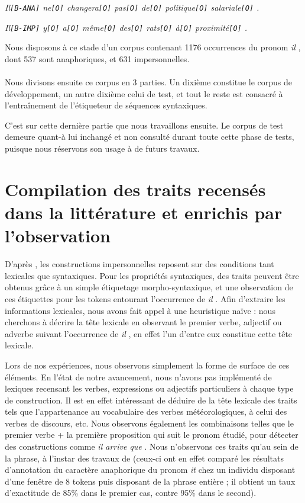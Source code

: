 \documentclass[a4paper,12pt]{article}
\begin{document}
\textit{Il\verb![B-ANA]! ne\verb![O]! changera\verb![O]! pas\verb![O]! de\verb![O]! politique\verb![O]! salariale\verb![O]! .}

\textit{Il\verb![B-IMP]! y\verb![O]! a\verb![O]! même\verb![O]! des\verb![O]! rats\verb![O]! à\verb![O]! proximité\verb![O]! .}

Nous disposons à ce stade d'un corpus contenant 1176 occurrences du pronom \og \textit{il} \fg{}, dont 537 sont anaphoriques, et 631 impersonnelles.

\paragraph{}
Nous divisons ensuite ce corpus en 3 parties. Un dixième constitue le corpus de développement, un autre dixième celui de test, et tout le reste est consacré à l'entraînement de l'étiqueteur de séquences syntaxiques.


C'est sur cette dernière partie que nous travaillons ensuite.
Le corpus de test demeure quant-à lui inchangé et non consulté durant toute cette phase de tests, puisque nous réservons son usage à de futurs travaux.

\section{Compilation des traits recensés dans la littérature et enrichis par l'observation}
\label{approche-traits}

D'après \citeauthor{danlos-ilimp-taln2005}, les constructions impersonnelles reposent sur des conditions tant lexicales que syntaxiques. Pour les propriétés syntaxiques, des traits peuvent \^etre obtenus grâce à un simple étiquetage morpho-syntaxique, et une observation de ces étiquettes pour les tokens entourant l'occurrence de \og \textit{il} \fg{}. Afin d'extraire les informations lexicales, nous avons fait appel à une heuristique naïve : nous cherchons à décrire la tête lexicale en observant le premier verbe, adjectif ou adverbe suivant l'occurrence de \og \textit{il} \fg{}, en effet l'un d'entre eux constitue cette tête lexicale.

Lors de nos expériences, nous observons simplement la forme de surface de ces éléments. En l'état de notre avancement, nous n'avons pas implémenté de lexiques recensant les verbes, expressions ou adjectifs particuliers à chaque type de construction. Il est en effet intéressant de déduire de la tête lexicale des traits tels que l'appartenance au vocabulaire des verbes météorologiques, à celui des verbes de discours, etc.
Nous observons également les combinaisons telles que le premier verbe + la première proposition qui suit le pronom étudié, pour détecter des constructions comme \og \textit{il arrive que} \fg{}. Nous n'observons ces traits qu'au sein de la phrase, à l'instar des travaux de \citeauthor{Bergsma-11} (ceux-ci ont en effet comparé les résultats d'annotation du caractère anaphorique du pronom \og{}\textit{it}\fg{} chez un individu disposant d'une fenêtre de 8 tokens puis disposant de la phrase entière ; il obtient un taux d'exactitude de 85\% dans le premier cas, contre 95\% dans le second).
\end{document}
